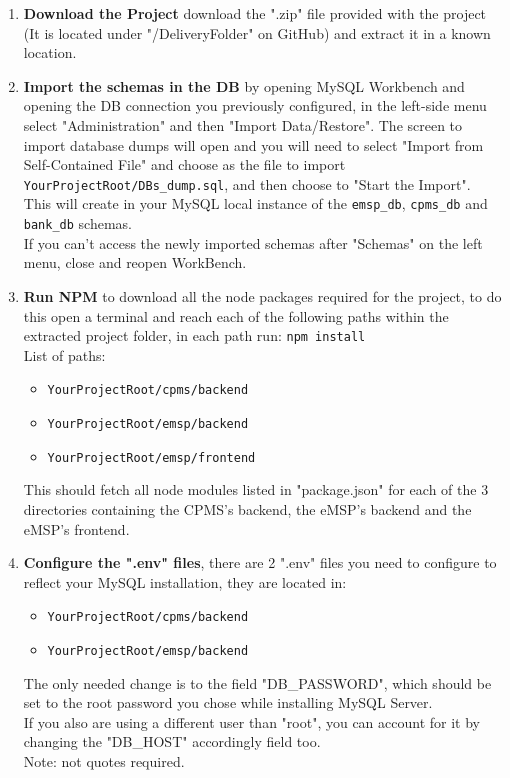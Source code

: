 \documentclass[11pt]{article}
\newcommand{\code}[1]{\colorbox{light-gray}{\texttt{#1}}}
\def\code#1{{\texttt{#1}}}
\begin{document}
\begin{enumerate}
    \item \textbf{Download the Project} download the ".zip" file provided with the project (It is located under "/DeliveryFolder" on GitHub) and extract it in a known location.
    \item \textbf{Import the schemas in the DB} by opening MySQL Workbench and opening the DB connection you previously configured, in the left-side menu select "Administration" and then "Import Data/Restore". The screen to import database dumps will open and you will need to select "Import from Self-Contained File" and choose as the file to import \code{YourProjectRoot/DBs\_dump.sql}, and then choose to "Start the Import". \\
    This will create in your MySQL local instance of the \code{emsp\_db}, \code{cpms\_db} and \code{bank\_db} schemas. \\
    If you can't access the newly imported schemas after "Schemas" on the left menu, close and reopen WorkBench.
    \item \textbf{Run NPM} to download all the node packages required for the project, to do this open a terminal and reach each of the following paths within the extracted project folder, in each path run: \code{npm install} \\
    List of paths:
    \begin{itemize}
        \item \code{YourProjectRoot/cpms/backend}
        \item \code{YourProjectRoot/emsp/backend}
        \item \code{YourProjectRoot/emsp/frontend}
    \end{itemize}
    This should fetch all node modules listed in "package.json" for each of the 3 directories containing the CPMS's backend, the eMSP's backend and the eMSP's frontend.
    \item \textbf{Configure the ".env" files}, there are 2 ".env" files you need to configure to reflect your MySQL installation, they are located in:
    \begin{itemize}
        \item \code{YourProjectRoot/cpms/backend}
        \item \code{YourProjectRoot/emsp/backend}
    \end{itemize}
    The only needed change is to the field "DB\_PASSWORD", which should be set to the root password you chose while installing MySQL Server. \\
    If you also are using a different user than "root", you can account for it by changing the "DB\_HOST" accordingly field too. \\
    Note: not quotes required.
\end{enumerate}
\end{document}
